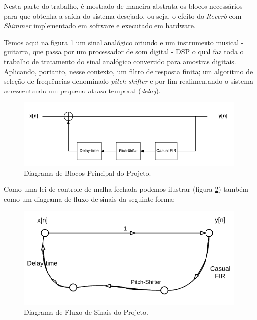 	Nesta parte do trabalho, é mostrado de maneira abstrata os blocos necessários para que obtenha a saída do sistema desejado, ou seja, o efeito do \textit{Reverb} com \textit{Shimmer} implementado em software e executado em hardware.
	
	Temos aqui na figura \ref{bloco-principal} um sinal analógico oriundo e um instrumento musical - guitarra, que passa por um processador de som digital - DSP o qual faz toda o trabalho de tratamento do sinal analógico convertido para amostras digitais. Aplicando, portanto, nesse contexto, um filtro de resposta finita; um algoritmo de seleção de frequências denominado \textit{pitch-shifter} e por fim realimentando o sistema acrescentando um pequeno atraso temporal (\textit{delay}).
	
	\begin{figure}[!h t b]
		\label{bloco-principal}
		\centering
		\includegraphics[scale=0.5]{./figuras/diagrama_bloco_principal.PNG}
		\caption{Diagrama de Blocos Principal do Projeto.}
	\end{figure}

	Como uma lei de controle de malha fechada podemos ilustrar (figura \ref{signal_principal}) também como um diagrama de fluxo de sinais da seguinte forma:
	
	\begin{figure}[!h t b]
		\centering
		\includegraphics[scale=0.5]{./figuras/fluxo_de_sinais_principal.png}
		\caption{Diagrama de Fluxo de Sinais do Projeto.}	
		\label{signal_principal}
	\end{figure}
	
	
	
	
	
	

